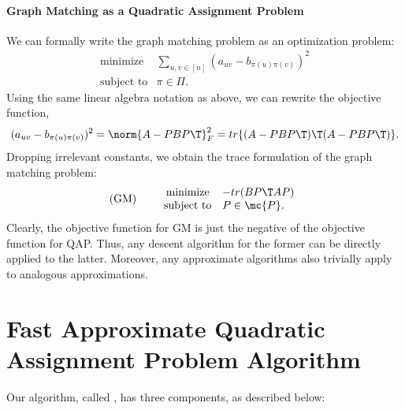 \documentclass{article} %
\begin{document}
\paragraph{Graph Matching as a Quadratic Assignment Problem}

We can formally write the graph matching problem as an optimization problem:
\begin{equation*}
\begin{array}{cl}
			\text{minimize}   &\sum_{u,v \in [n]} (a_{uv}-b_{\pi(u)\pi(v)})^2 \\
			\text{subject to}  &\pi \in \Pi.   
\end{array}\label{eq:GM}
\end{equation*}
Using the same linear algebra notation as above, we can rewrite the objective function, 
\begin{align} \label{eq:equiv}
(a_{uv}-b_{\pi(u)\pi(v)})^2 = \norm{A - PBP\T}_F^2  = tr \{ (A - PBP\T)\T (A - PBP\T)\}.
\end{align}
Dropping irrelevant constants, we obtain the trace formulation of the graph matching problem:
\begin{equation}
\text{(GM)} \qquad  
\begin{array}{cl}
			\text{minimize}   & - tr(B P\T AP) \\
			\text{subject to}  &P \in \mc{P}.   
\end{array}\label{eq:GM}
\end{equation}
Clearly, the objective function for GM is just the negative of the objective function for QAP. Thus, any descent algorithm for the former can be directly applied to the latter.  Moreover, any approximate algorithms also trivially apply to analogous approximations.


\vspace{-5pt}
\section{Fast Approximate Quadratic Assignment Problem Algorithm} %
\label{sec:FAQ}
\vspace{-5pt}


Our algorithm, called \FAQ, has three components, as described below:
\end{document}
